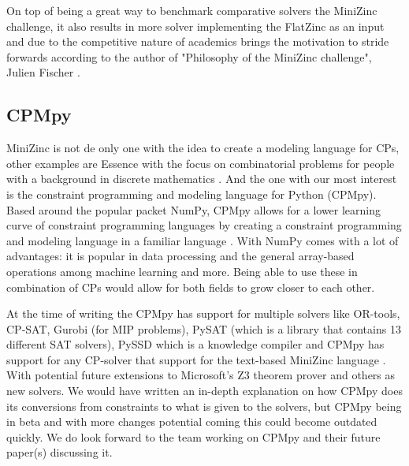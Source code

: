 On top of being a great way to benchmark comparative solvers the MiniZinc challenge, it also results in more solver implementing the FlatZinc as an input and due to the competitive nature of academics brings the motivation to stride forwards according to the author of "Philosophy of the MiniZinc challenge", Julien Fischer \cite{59stuckey2010philosophy}.

\subsection{CPMpy}
\label{CP:CPMpy}
MiniZinc is not de only one with the idea to create a modeling language for CPs, other examples are Essence with the focus on combinatorial problems for people with a background in discrete mathematics \cite{70frisch2008essence}.
And the one with our most interest is the constraint programming and modeling language for Python (CPMpy). Based around the popular packet NumPy, CPMpy allows for a lower learning curve of constraint programming languages by creating a constraint programming and modeling language in a familiar language \cite{17guns2019increasing}. 
With NumPy comes with a lot of advantages: it is popular in data processing and the general array-based operations among machine learning and more. 
Being able to use these in combination of CPs would allow for both fields to grow closer to each other. 

At the time of writing the CPMpy has support for multiple solvers like OR-tools, CP-SAT, Gurobi (for MIP problems), PySAT (which is a library that contains 13 different SAT solvers), PySSD which is a knowledge compiler  and CPMpy has support for any CP-solver that support for the text-based MiniZinc language \cite{CPMpyDoc, CPMpyGithub}. With potential future extensions to Microsoft's Z3 theorem prover and others as new solvers.
We would have written an in-depth explanation on how CPMpy does its conversions from constraints to what is given to the solvers, but CPMpy being in beta and with more changes potential coming this could become outdated quickly. We do look forward to the team working on CPMpy and their future paper(s) discussing it.


